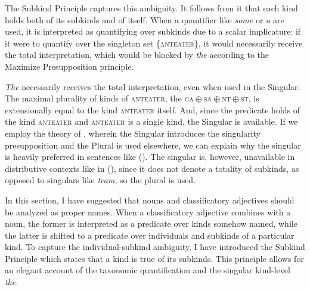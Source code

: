 \documentclass[a4paper, 12pt]{article}
\begin{document}
The Subkind Principle captures this ambiguity. It follows from it that each kind holds both of its subkinds and of itself. When a quantifier like \textit{some} or \textit{a} are used, it is interpreted as quantifying over subkinds due to a scalar implicature: if it were to quantify over the singleton set \{\textsc{anteater}\}, it would necessarily receive the total interpretation, which would be blocked by \textit{the} according to the Maximize Presupposition principle.

\textit{The} necessarily receives the total interpretation, even when used in the Singular. The maximal plurality of kinds of \textsc{anteater}, the \textsc{$\text{ga}\oplus\text{sa}\oplus\text{nt}\oplus\text{st}$}, is extensionally equal to the kind \textsc{anteater} itself. And, since the predicate holds of the kind \textsc{anteater} and \textsc{anteater} is a single kind, the Singular is available. If we employ the theory of \textcite{sauerland2005pluralsemanticallyunmarked}, wherein the Singular introduces the singularity presupposition and the Plural is used elsewhere, we can explain why the singular is heavily preferred in sentences like (). The singular is, however, unavailable in distributive contexts like in (), since it does not denote a totality of subkinds, as opposed to singulars like \textit{team}, so the plural is used.

In this section, I have suggested that nouns and classificatory adjectives should be analyzed as proper names. When a classificatory adjective combines with a noun, the former is interpreted as a predicate over kinds somehow named, while the latter is shifted to a predicate over individuals and subkinds of a particular kind. To capture the individual-subkind ambiguity, I have introduced the Subkind Principle which states that a kind is true of its subkinds. This principle allows for an elegant account of the taxonomic quantification and the singular kind-level \textit{the}.



\end{document}
